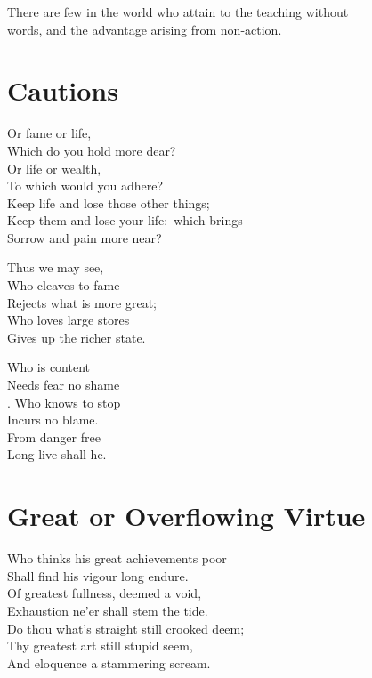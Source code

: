     There are few in the world who attain to the teaching without\\
    words, and the advantage arising from non-action.\vspace{\baselineskip}
    
\section*{Cautions}
    Or fame or life,\\
    Which do you hold more dear?\\
    Or life or wealth,\\
    To which would you adhere?\\
    Keep life and lose those other things;\\
    Keep them and lose your life:--which brings\\
    Sorrow and pain more near?\vspace{\baselineskip}
    
    Thus we may see,\\
    Who cleaves to fame\\
    Rejects what is more great;\\
    Who loves large stores\\
    Gives up the richer state.\vspace{\baselineskip}
    
    Who is content\\
    Needs fear no shame\\.
    Who knows to stop\\
    Incurs no blame.\\
    From danger free\\
    Long live shall he.\vspace{\baselineskip}
    \newpage{}
\section*{Great or Overflowing Virtue}
    Who thinks his great achievements poor\\
    Shall find his vigour long endure.\\
    Of greatest fullness, deemed a void,\\
    Exhaustion ne'er shall stem the tide.\\
    Do thou what's straight still crooked deem;\\
    Thy greatest art still stupid seem,\\
    And eloquence a stammering scream.\vspace{\baselineskip}
    
